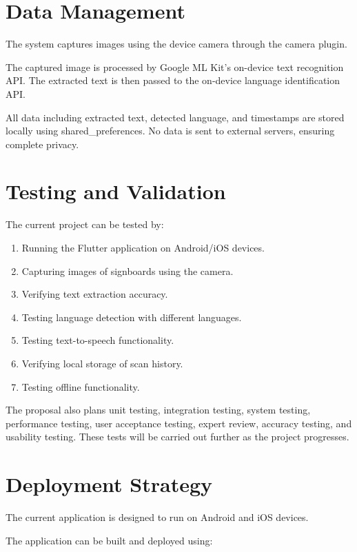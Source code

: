 \documentclass[12pt,a4paper]{report}
\begin{document}
\section{Data Management}

The system captures images using the device camera through the camera plugin.

The captured image is processed by Google ML Kit's on-device text recognition API. The extracted text is then passed to the on-device language identification API.

All data including extracted text, detected language, and timestamps are stored locally using shared\_preferences. No data is sent to external servers, ensuring complete privacy.

\section{Testing and Validation}

The current project can be tested by:

\begin{enumerate}
    \item Running the Flutter application on Android/iOS devices.
    \item Capturing images of signboards using the camera.
    \item Verifying text extraction accuracy.
    \item Testing language detection with different languages.
    \item Testing text-to-speech functionality.
    \item Verifying local storage of scan history.
    \item Testing offline functionality.
\end{enumerate}

The proposal also plans unit testing, integration testing, system testing, performance testing, user acceptance testing, expert review, accuracy testing, and usability testing. These tests will be carried out further as the project progresses. \cite{ref7}

\section{Deployment Strategy}

The current application is designed to run on Android and iOS devices.

The application can be built and deployed using:
\end{document}
